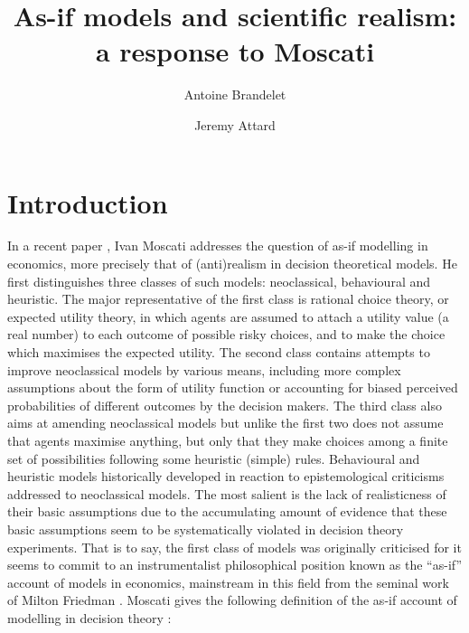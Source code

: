 \documentclass[a4paper,11pt]{article}
\title{As-if models and scientific realism: a response to Moscati}
\date{}
\author[1]{Antoine Brandelet}
\author[1,2]{Jeremy Attard}
\affil[1]{Department of Philosophy and History of Science, University of Mons, Belgium}
\affil[2]{Department of Sciences, Philosophies and Societies, University of Namur, Belgium}
\theoremstyle{definition}
\begin{document}


\section{Introduction}

In a recent paper \citep{Moscati2023}, Ivan Moscati addresses the question of as-if modelling in economics, more precisely that of (anti)realism in decision theoretical models. He first distinguishes three classes of such models: neoclassical, behavioural and heuristic. The major representative of the first class is rational choice theory, or expected utility theory, in which agents are assumed to attach a utility value (a real number) to each outcome of possible risky choices, and to make the choice which maximises the expected utility. The second class contains attempts to improve neoclassical models by various means, including more complex assumptions about the form of utility function or accounting for biased perceived probabilities of different outcomes by the decision makers. The third class also aims at amending neoclassical models but unlike the first two does not assume that agents maximise anything, but only that they make choices among a finite set of possibilities following some heuristic (simple) rules. Behavioural and heuristic models historically developed in reaction to epistemological criticisms addressed to neoclassical models. The most salient is the lack of realisticness of their basic assumptions due to the accumulating amount of evidence that these basic assumptions seem to be systematically violated in decision theory experiments. That is to say, the first class of models was originally criticised for it seems to commit to an instrumentalist philosophical position known as the ``as-if'' account of models in economics, mainstream in this field from the seminal work of Milton Friedman \cite{Friedman1953}. Moscati gives the following definition of the as-if account of modelling in decision theory \citep[p. 2]{Moscati2023}: 
\end{document}
